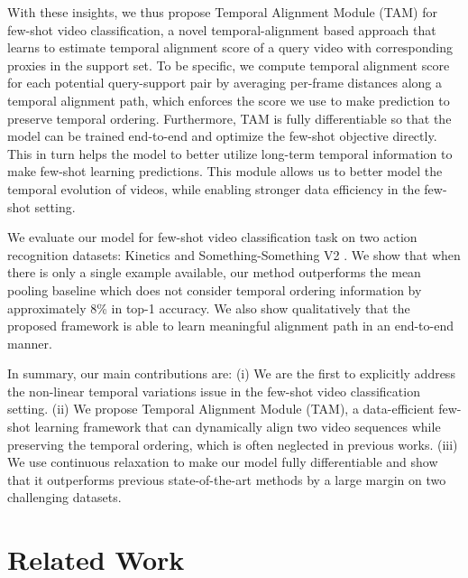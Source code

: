 \documentclass[10pt,twocolumn,letterpaper]{article}
\begin{document}
With these insights, we thus propose Temporal Alignment Module (TAM) for few-shot video classification, a novel temporal-alignment based approach that learns to estimate temporal alignment score of a query video with corresponding proxies in the support set. To be specific, we compute temporal alignment score for each potential query-support pair by averaging per-frame distances along a temporal alignment path, which enforces the score we use to make prediction to preserve temporal ordering. Furthermore, TAM is fully differentiable so that the model can be trained end-to-end and optimize the few-shot objective directly. This in turn helps the model to better utilize long-term temporal information to make few-shot learning predictions. This module allows us to better model the temporal evolution of videos, while enabling stronger data efficiency in the few-shot setting. 

We evaluate our model for few-shot video classification task on two action recognition datasets: Kinetics \cite{kay2017kinetics} and Something-Something V2 \cite{goyal2017something}. We show that when there is only a single example available, our method outperforms the mean pooling baseline which does not consider temporal ordering information by approximately 8\% in top-1 accuracy. We also show qualitatively that the proposed framework is able to learn meaningful alignment path in an end-to-end manner.

In summary, our main contributions are: (i) We are the first to explicitly address the non-linear temporal variations issue in the few-shot video classification setting. (ii) We propose Temporal Alignment Module (TAM), a data-efficient few-shot learning framework that can dynamically align two video sequences while preserving the temporal ordering, which is often neglected in previous works. (iii) We use continuous relaxation to make our model fully differentiable and show that it outperforms previous state-of-the-art methods by a large margin on two challenging datasets. 



\section{Related Work}
\end{document}
